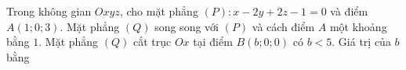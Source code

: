 \begin{ex}
Trong không gian $Oxyz$, cho mặt phẳng $(P)\colon x-2y+2z-1=0$ và điểm $A(1;0;3)$. Mặt phẳng $(Q)$ song song với $(P)$ và cách điểm $A$ một khoảng bằng $1$. Mặt phẳng $(Q)$ cắt trục $Ox$ tại điểm $B(b;0;0)$ có $b<5$. Giá trị của $b$ bằng
\end{ex}
